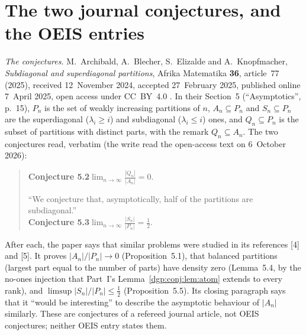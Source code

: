 \documentclass[11pt,letterpaper]{article}
\numberwithin{equation}{section}
\theoremstyle{remark}\newtheorem{remark}[theorem]{Remark}
\begin{document}
\section*{The two journal conjectures, and the OEIS entries}\label{dgp:sec:conjectures}
\emph{The conjectures.} M.~Archibald, A.~Blecher, S.~Elizalde and A.~Knopfmacher, \emph{Subdiagonal and superdiagonal partitions}, Afrika Matematika \textbf{36}, article~77 (2025), received 12~November 2024, accepted 27~February 2025, published online 7~April 2025, open access under CC~BY~4.0 \cite{abek}. In their Section~5 (``Asymptotics'', p.~15), $P_n$ is the set of weakly increasing partitions of $n$, $A_n\subseteq P_n$ and $S_n\subseteq P_n$ are the superdiagonal ($\lambda_i\ge i$) and subdiagonal ($\lambda_i\le i$) ones, and $Q_n\subseteq P_n$ is the subset of partitions with distinct parts, with the remark $Q_n\subseteq A_n$. The two conjectures read, verbatim (the write read the open-access text on 6~October 2026):
\begin{quote}
\textbf{Conjecture 5.2}\quad $\displaystyle\lim_{n\to\infty}\frac{|Q_n|}{|A_n|}=0.$

``We conjecture that, asymptotically, half of the partitions are subdiagonal.''\\
\textbf{Conjecture 5.3}\quad $\displaystyle\lim_{n\to\infty}\frac{|S_n|}{|P_n|}=\frac12.$
\end{quote}
After each, the paper says that similar problems were studied in its references [4] and [5]. It proves $|A_n|/|P_n|\to0$ (Proposition~5.1), that balanced partitions (largest part equal to the number of parts) have density zero (Lemma~5.4, by the no-ones injection that Part~I's Lemma~\ref{dgp:conj:lem:atom} extends to every rank), and $\limsup|S_n|/|P_n|\le\frac12$ (Proposition~5.5). Its closing paragraph says that it ``would be interesting'' to describe the asymptotic behaviour of $|A_n|$ similarly. These are conjectures of a refereed journal article, not OEIS conjectures; neither OEIS entry states them.
\end{document}
